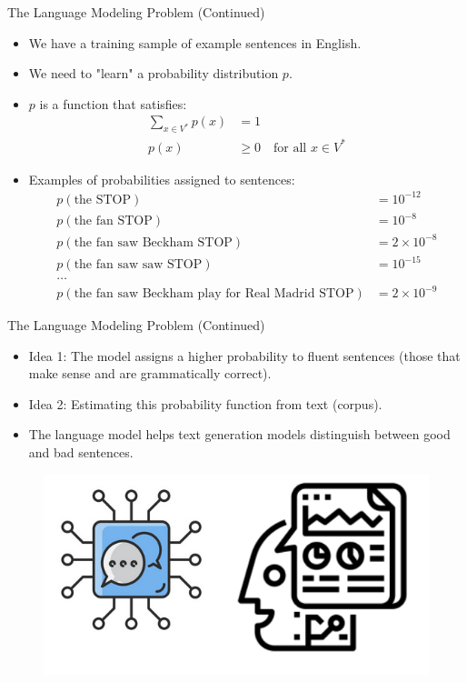 \documentclass[handout]{beamer}
\begin{document}
\begin{frame}{The Language Modeling Problem (Continued)}
\begin{scriptsize}
\begin{itemize}
\item We have a training sample of example sentences in English.
\item We need to "learn" a probability distribution $p$.
\item $p$ is a function that satisfies:
\begin{align*}
\sum_{x\in V^*} p(x) &= 1 \\
p(x) &\geq 0 \quad \text{for all } x \in V^*
\end{align*}


\item Examples of probabilities assigned to sentences:
\begin{align*}
p(\text{the STOP}) &= 10^{-12} \\
p(\text{the fan STOP}) &= 10^{-8} \\
p(\text{the fan saw Beckham STOP}) &= 2 \times 10^{-8} \\
p(\text{the fan saw saw STOP}) &= 10^{-15} \\
\ldots \\
p(\text{the fan saw Beckham play for Real Madrid STOP}) &= 2 \times 10^{-9}
\end{align*}
\end{itemize}
\end{scriptsize}
\end{frame}



\begin{frame}{The Language Modeling Problem (Continued)}
\begin{scriptsize}
\begin{itemize}
\item Idea 1: The model assigns a higher probability to fluent sentences (those that make sense and are grammatically correct).
\item Idea 2: Estimating this probability function from text (corpus).
\item The language model helps text generation models distinguish between good and bad sentences.
\end{itemize}
\end{scriptsize}

\begin{figure}[h]
\includegraphics[scale = 0.4]{pics/lmdiagram.png}
\end{figure}
\end{frame}
\end{document}
